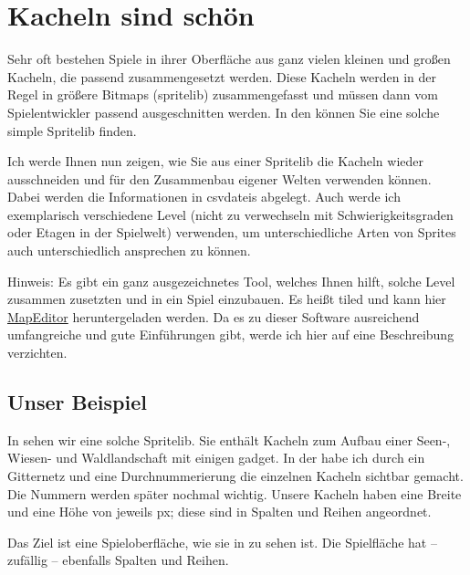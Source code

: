 \section{Kacheln sind schön}

Sehr oft bestehen Spiele in ihrer Oberfläche aus ganz vielen kleinen und großen Kacheln, die passend zusammengesetzt werden. Diese Kacheln werden in der Regel in größere Bitmaps (\Gls{spritelib}) zusammengefasst und müssen dann vom Spielentwickler passend ausgeschnitten werden. In den  können Sie eine solche simple Spritelib finden.

Ich werde Ihnen nun zeigen, wie Sie aus einer Spritelib die Kacheln wieder ausschneiden und für den Zusammenbau eigener Welten verwenden können. Dabei werden die Informationen in \Glspl{csvdatei} abgelegt. Auch werde ich exemplarisch verschiedene Level (nicht zu verwechseln mit Schwierigkeitsgraden oder Etagen in der Spielwelt) verwenden, um unterschiedliche Arten von Sprites auch unterschiedlich ansprechen zu können.

Hinweis: Es gibt ein ganz ausgezeichnetes Tool, welches Ihnen hilft, solche Level zusammen zusetzten und in ein Spiel einzubauen. Es heißt \Gls{tiled} und kann hier \hyperlink{https://www.mapeditor.org/}{MapEditor} heruntergeladen werden. Da es zu dieser Software ausreichend umfangreiche und gute Einführungen gibt, werde ich hier auf eine Beschreibung verzichten.


\subsection{Unser Beispiel}


In  sehen wir eine solche Spritelib. Sie enthält Kacheln zum Aufbau einer Seen-, Wiesen- und Waldlandschaft mit einigen \Gls{gadget}. In der  habe ich durch ein Gitternetz und eine Durchnummerierung die einzelnen Kacheln sichtbar gemacht. Die Nummern werden später nochmal wichtig. Unsere Kacheln haben eine Breite und eine Höhe von jeweils \unit[32]{px}; diese sind in \unit[16]{Spalten} und \unit[12]{Reihen} angeordnet. 

Das Ziel ist eine Spieloberfläche, wie sie in  zu sehen ist. Die Spielfläche hat -- zufällig -- ebenfalls \unit[16]{Spalten} und \unit[12]{Reihen}.

